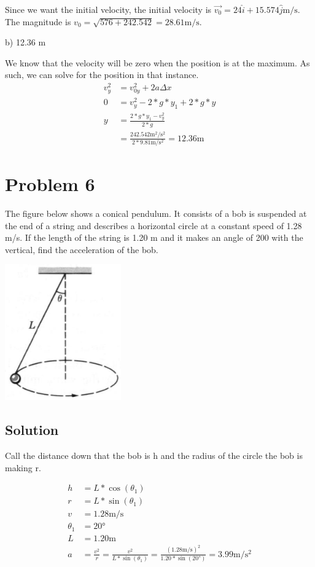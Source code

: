 \documentclass[12pt]{article}
\begin{document}
Since we want the initial velocity, the initial velocity is $ \boxed{ \vec{v_0} = 24\hat{i} + 15.574 \hat{j} \unit{\meter/\second} } $. The magnitude is $ v_0 = \sqrt{576 + 242.542} = 28.61 \unit{\meter/\second} $.

b) 12.36 m

We know that the velocity will be zero when the position is at the maximum. As such, we can solve for the position in that instance.
\begin{align}
    v_y^2 &= v_{0y}^2 + 2a\Delta x\\
    0 &= v_y^2 - 2*g*y_1 + 2*g*y\\
    y &= \frac{2*g*y_1 - v_y^2}{2*g}\\
        &= \frac{242.542 \unit{\meter^2/\second^2}}{2*9.81 \unit{\meter/\second^2}} = \boxed{ 12.36 \unit{\meter} }
\end{align}

\pagebreak
\section*{Problem 6}
The figure below shows a conical pendulum. It consists of a bob is suspended at the end of a
string and describes a horizontal circle at a constant speed of 1.28 m/s. If the length of the
string is 1.20 m and it makes an angle of 200 with the vertical, find the acceleration of the bob.

\begin{center}
    \includegraphics*[width=5cm]{graph_6.png}
\end{center}

\subsection*{Solution}
Call the distance down that the bob is h and the radius of the circle the bob is making r.

\begin{align}
    h &= L*\cos(\theta_1)\\
    r &= L*\sin(\theta_1)\\
    v &= 1.28 \unit{\meter/\second}\\
    \theta_1 &= 20 \unit{\degree}\\
    L &= 1.20 \unit{\meter}\\
    a &= \frac{v^2}{r} = \frac{v^2}{L*\sin(\theta_1)} = \frac{(1.28 \unit{\meter/\second})^2}{1.20 * \sin(20\unit{\degree})} = \boxed{3.99 \unit{\meter/\second^2}}
\end{align}
\end{document}
